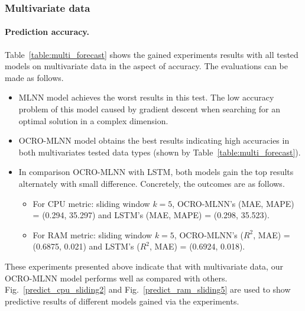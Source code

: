 \documentclass[11pt,twoside]{article}
\begin{document}
\begin{multicols}{2}
\subsubsection{Multivariate data}

\paragraph{\textbf{Prediction accuracy.}} Table~\ref{table:multi_forecast} shows the gained experiments results with all tested models on multivariate data in the aspect of accuracy. The evaluations can be made as follows.

\begin{itemize}
\item MLNN model achieves the worst results in this test. The low accuracy problem of this model caused by gradient descent when searching for an optimal solution in a complex dimension. 
\item OCRO-MLNN model obtains the best results indicating high accuracies in both multivariates tested data types (shown by Table~\ref{table:multi_forecast}).
\item In comparison OCRO-MLNN with LSTM, both models gain the top results alternately with small difference. Concretely, the outcomes are as follows. 
	\begin{itemize}
	\item For CPU metric: sliding window $k = 5$, OCRO-MLNN's (MAE, MAPE) = (0.294, 35.297) and LSTM's (MAE, MAPE) = (0.298, 35.523).
	\item For RAM metric: sliding window $k = 5$, OCRO-MLNN's ($R^2$, MAE) = (0.6875, 0.021) and LSTM's ($R^2$, MAE) = (0.6924, 0.018).
	\end{itemize}
\end{itemize}

These experiments presented above indicate that with multivariate data, our OCRO-MLNN model performs well as compared with others. Fig.~\ref{predict_cpu_sliding2} and Fig.~\ref{predict_ram_sliding5} are used to show predictive results of different models gained via the experiments.




\end{multicols}
\end{document}
